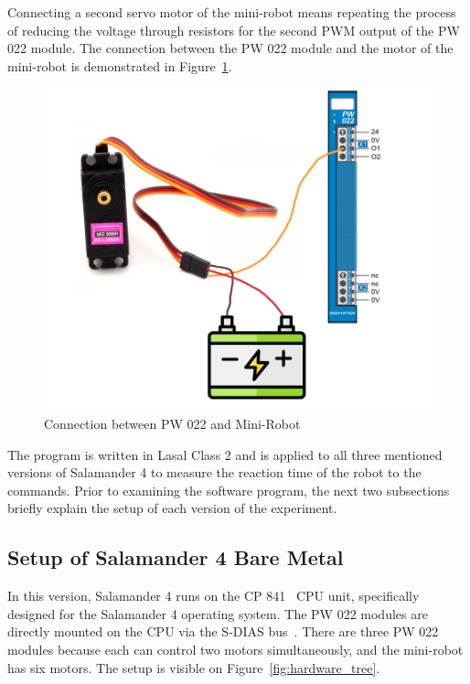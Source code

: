 \documentclass[MMR,Master,english]{twbook}
\begin{document}
\noindent Connecting a second servo motor of the mini-robot means repeating the process of reducing the voltage through resistors for the second PWM output of the PW 022 module. The connection between the PW 022 module and the motor of the mini-robot is demonstrated in Figure~\ref{fig:pw022_minirobot_connection}.

\begin{figure}[H]
	\centering
	\includegraphics[width=0.7\columnwidth]{img/experiment/pw022_minirobot.png}
	\caption[Connection between PW 022 and Mini-Robot]{Connection between PW 022 and Mini-Robot~\cite{MG996RDigitalServo}}
	\label{fig:pw022_minirobot_connection}
\end{figure}

\noindent The program is written in Lasal Class 2 and is applied to all three mentioned versions of Salamander 4 to measure the reaction time of the robot to the commands. Prior to examining the software program, the next two subsections briefly explain the setup of each version of the experiment.

\subsection{Setup of Salamander 4 Bare Metal}
In this version, Salamander 4 runs on the CP 841~\cite{CPUUnitsSIGMATEK} CPU unit, specifically designed for the Salamander 4 operating system. The PW 022 modules are directly mounted on the CPU via the S-DIAS bus~\cite{SDIASSIGMATEK}. There are three PW 022 modules because each can control two motors simultaneously, and the mini-robot has six motors. The setup is visible on Figure~\ref{fig:hardware_tree}.
\end{document}
